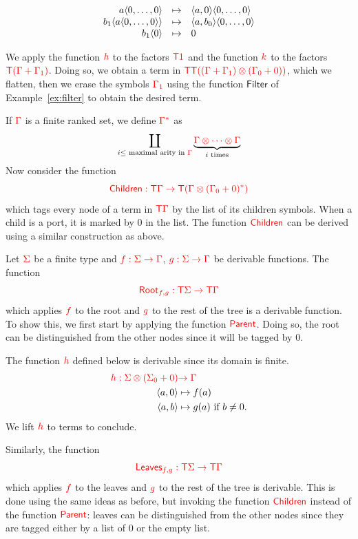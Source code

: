 \begin{example}
\begin{enumerate}
$$\begin{array}{rll}
a\langle{0,\dots, 0}\rangle& \mapsto & \langle{a,0}\rangle\langle{0,\dots,0}\rangle\\
b_1\langle{a\langle{0,\dots,0}\rangle}\rangle&\mapsto& \langle{a,b_0}\rangle\langle{0,\dots,0}\rangle\\
b_1\langle{0}\rangle &\mapsto& 0
\end{array}$$
\end{enumerate}
We apply the function ${\color{red}{h}}$ to the factors ${\color{red}{{\color{red}{\mathsf T}}1}}$ and the function ${\color{red}{k}}$ to the factors ${\color{red}{{\color{red}{\mathsf T}}({\color{red}{\Gamma}}+{\color{red}{\Gamma}}_1)}}$. Doing so, we obtain a term in ${\color{red}{{\color{red}{\mathsf T}}{\color{red}{\mathsf T}}((\Gamma+\Gamma_1)\otimes(\Gamma_0+0))}}$, which we flatten, then we erase the symbols ${\color{red}{\Gamma_1}}$ using the function $\mathsf{Filter}$ of Example~\ref{ex:filter} to obtain the desired term. 
	

\smallskip
If ${\color{red}{\Gamma}}$ is a finite ranked set, we define ${\color{red}{\Gamma^*}}$ as
$$\coprod_{i \leq \text{ maximal arity in } {\color{red}{\Gamma}}} \underbrace{{\color{red}{{\color{red}{\Gamma}}\otimes \cdots \otimes {\color{red}{\Gamma}}}}}_{i\text{ times}}$$
Now consider the function $${\color{red}{\mathsf{Children}:{\color{red}{\mathsf T}}{\color{red}{\Gamma}}\to {\color{red}{\mathsf T}}({\color{red}{\Gamma}}\otimes ({\color{red}{\Gamma}}_0+0)^*)}}$$ which tags every node of a term in ${\color{red}{\mathsf T}} {\color{red}{\Gamma}}$ by the list  of its children symbols. When a child is a port, it is marked by $0$ in the list.
The function ${\color{red}{\mathsf{Children}}}$ can be derived using a similar construction as above.
\end{example}



\noindent  \begin{example} Let ${\color{red}{\Sigma}}$ be a finite type and ${\color{red}{f:{\color{red}{\Sigma}}\to {\color{red}{\Gamma}}}}$, ${\color{red}{g: {\color{red}{\Sigma}}\to {\color{red}{\Gamma}}}}$ be derivable functions. The function $${\color{red}{\mathsf{Root}_{f,g} : {\color{red}{\mathsf T}}{\color{red}{\Sigma}}\to {\color{red}{\mathsf T}}{\color{red}{\Gamma}}}}$$
which applies ${\color{red}{f}}$ to the root and ${\color{red}{g}}$ to the rest of the tree is a derivable function.
To show this, we first start by applying the function ${\color{red}{\mathsf{Parent}}}$. Doing so, the root can be distinguished from the other nodes since it will be tagged by $0$.  

The function ${\color{red}{h}}$ defined below is derivable since its domain is finite. 
\begin{align*}
{\color{red}{h:{\color{red}{\Sigma}}\otimes({\color{red}{\Sigma}}_0+0)}}&{\color{red}{\to {\color{red}{\Gamma}}}}\\
  \langle{a,0}\rangle &\mapsto f(a) \\
  \langle{a,b}\rangle &\mapsto g(a) \text{ if } b\neq 0.
\end{align*}
We lift ${\color{red}{h}}$ to terms to conclude.

\smallskip
Similarly, the function $${\color{red}{\mathsf{Leaves}_{f,g} : {\color{red}{\mathsf T}}{\color{red}{\Sigma}}\to {\color{red}{\mathsf T}}{\color{red}{\Gamma}}}}$$
 which applies ${\color{red}{f}}$ to the leaves and ${\color{red}{g}}$ to the rest of the tree is derivable. This is done using the same ideas as before, but invoking the function ${\color{red}{\mathsf{Children}}}$ instead of the function ${\color{red}{\mathsf{Parent}}}$: leaves can be distinguished from the other nodes since they are tagged either by a list of $0$ or the empty list.
\end{example}



